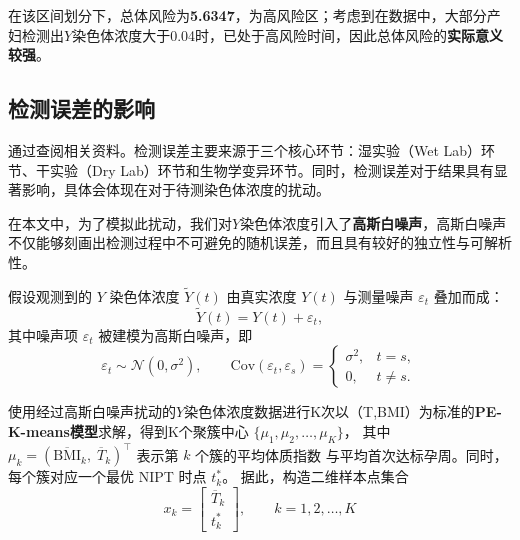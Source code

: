 \documentclass[12pt]{ctexart}
\begin{document}
在该区间划分下，总体风险为\textbf{5.6347}，为高风险区；考虑到在数据中，大部分产妇检测出$Y$染色体浓度大于0.04时，已处于高风险时间，因此总体风险的\textbf{实际意义较强}。

	\subsection{检测误差的影响}
	通过查阅相关资料。检测误差主要来源于三个核心环节：湿实验（Wet Lab）环节、干实验（Dry Lab）环节和生物学变异环节。同时，检测误差对于结果具有显著影响，具体会体现在对于待测染色体浓度的扰动。
	
	在本文中，为了模拟此扰动，我们对$Y$染色体浓度引入了\textbf{高斯白噪声}，高斯白噪声不仅能够刻画出检测过程中不可避免的随机误差，而且具有较好的独立性与可解析性。
	
	假设观测到的 $Y$ 染色体浓度 
	$\tilde{Y}(t)$ 由真实浓度 $Y(t)$ 与测量噪声 $\varepsilon_t$ 叠加而成：
	\begin{equation}
	\tilde{Y}(t) = Y(t) + \varepsilon_t,
	\end{equation}
	其中噪声项 $\varepsilon_t$ 被建模为高斯白噪声，即
	\begin{equation}
	\varepsilon_t \sim \mathcal{N}(0,\sigma^2), \qquad
	\mathrm{Cov}(\varepsilon_t,\varepsilon_s) = 
	\begin{cases}
		\sigma^2, & t=s, \\
		0, & t\neq s.
	\end{cases}
	\end{equation}
	
	使用经过高斯白噪声扰动的$Y$染色体浓度数据进行K次以（T,BMI）为标准的\textbf{PE-K-means模型}求解，得到K个聚簇中心 $\{\mu_1,\mu_2,\dots,\mu_K\}$，
	其中 $\mu_k=(\overline{\mathrm{BMI}}_k,\; \overline{T}_k)^\top$ 表示第 $k$ 个簇的平均体质指数
	与平均首次达标孕周。同时，每个簇对应一个最优 NIPT 时点 $t_k^*$。
	据此，构造二维样本点集合
	\[
	x_k = \begin{bmatrix} \overline{T}_k \\[2pt] t_k^* \end{bmatrix},
	\qquad k=1,2,\dots,K
	\]
	
\end{document}

